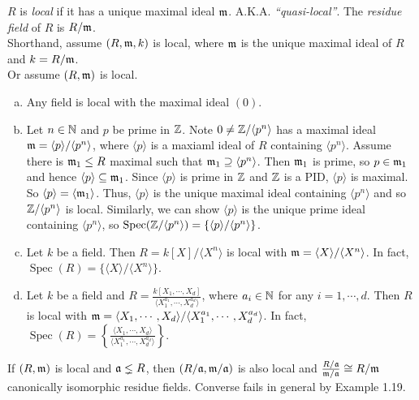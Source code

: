 \begin{definition}
    $R$ is \emph{local} if it has a unique maximal ideal $\mathfrak{m}$. A.K.A. \emph{``quasi-local''}. The \emph{residue field} of $R$ is $R/\mathfrak{m}$. \\
    Shorthand, assume $(R,\mathfrak{m},k)$ is local, where $\mathfrak{m}$ is the unique maximal ideal of $R$ and $k = R/\mathfrak{m}$. \\
    Or assume $(R,\mathfrak{m})$ is local.
\end{definition}

\begin{example}
    \begin{enumerate}[(a)]
        \item Any field is local with the maximal ideal $(0)$.
        \item Let $n \in \mathbb{N}$ and $p$ be prime in $\mathbb{Z}$. Note $0 \neq \mathbb{Z}/\langle p^n \rangle$ has a maximal ideal $\mathfrak{m} = \langle p \rangle/\langle p^n \rangle$, where $\langle p \rangle$ is a maxiaml ideal of $R$ containing $\langle p^n \rangle$. Assume there is $\mathfrak{m}_1 \leq R$ maximal such that $\mathfrak{m}_1 \supseteq \langle p^n \rangle$. Then $\mathfrak{m}_1$ is prime, so $p \in \mathfrak{m}_1$ and hence $\langle p \rangle \subseteq \mathfrak{m}_1$. Since $\langle p \rangle$ is prime in $\mathbb{Z}$ and $\mathbb{Z}$ is a PID, $\langle p \rangle$ is maximal. So $\langle p \rangle = \langle \mathfrak{m}_1 \rangle$. Thus, $\langle p \rangle$ is the unique maximal ideal containing $\langle p^n \rangle$ and so $\mathbb{Z}/\langle p^n \rangle$ is local. Similarly, we can show $\langle p \rangle$ is the unique prime ideal containing $\langle p^n \rangle$, so $\operatorname{Spec}(\mathbb{Z}/\langle p^n \rangle) = \left\{\langle p \rangle/\langle p^n \rangle\right\}$. 
        \item Let $k$ be a field. Then $R = k[X]/\langle X^n \rangle$ is local with $\mathfrak{m} = \langle X \rangle / \langle X^n \rangle$. In fact, $\operatorname{Spec}(R) = \{\langle X \rangle/\langle X^n \rangle\}$.
        \item Let $k$ be a field and $R = \frac{k[X_1,\cdots,X_d]}{\langle X_1^{a_1}, \cdots, X_d^{a_d}\rangle}$, where $a_i \in \mathbb{N}$ for any $i = 1,\cdots,d$. Then $R$ is local with $\mathfrak{m} = \langle X_1,\cdots,X_d\rangle/\langle X_1^{a_1},\cdots,X_d^{a_d} \rangle$. In fact, $\operatorname{Spec}(R) = \left\{\frac{\langle X_1,\cdots,X_d\rangle}{\langle X_1^{a_1}, \cdots, X_d^{a_d}\rangle}\right\}$.
    \end{enumerate}
\end{example}

\begin{fact}
    If $(R,\mathfrak{m})$ is local and $\mathfrak{a} \lneq R$, then $(R/\mathfrak{a},\mathfrak{m}/\mathfrak{a})$ is also local and $\frac{R/\mathfrak{a}}{\mathfrak{m}/\mathfrak{a}} \cong R/\mathfrak{m}$ canonically isomorphic residue fields. Converse fails in general by Example 1.19. 
\end{fact}

